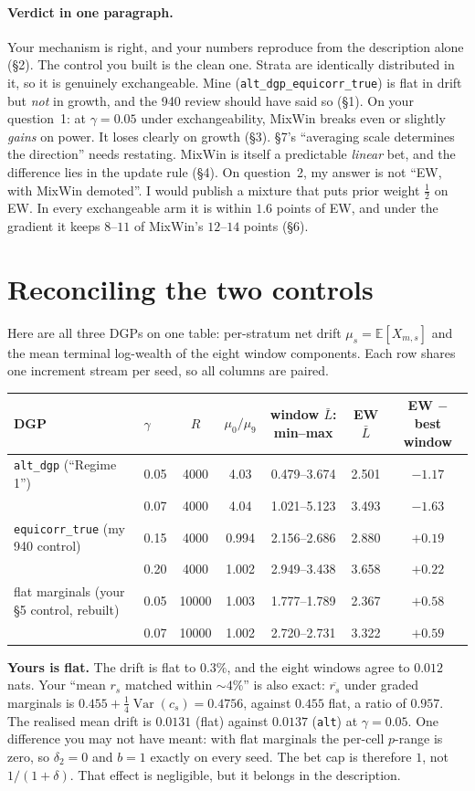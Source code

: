 \documentclass[11pt]{article}
\newcommand{\E}{\mathbb{E}}
\begin{document}
\paragraph{Verdict in one paragraph.} Your mechanism is right, and your numbers reproduce from the description alone (\S2). The control you built is the clean one. Strata are identically distributed in it, so it is genuinely exchangeable. Mine (\texttt{alt\_dgp\_equicorr\_true}) is flat in drift but \emph{not} in growth, and the 940 review should have said so (\S1).
On your question~1: at $\gamma=0.05$ under exchangeability, MixWin breaks even or slightly \emph{gains} on power. It loses clearly on growth (\S3).
\S7's ``averaging scale determines the direction'' needs restating. MixWin is itself a predictable \emph{linear} bet, and the difference lies in the update rule (\S4).
On question~2, my answer is not ``EW, with MixWin demoted''. I would publish a mixture that puts prior weight $\tfrac12$ on EW. In every exchangeable arm it is within $1.6$ points of EW, and under the gradient it keeps $8$--$11$ of MixWin's $12$--$14$ points (\S6).

\section{Reconciling the two controls}\label{sec:controls}
Here are all three DGPs on one table: per-stratum net drift $\mu_s=\E[X_{m,s}]$ and the mean terminal log-wealth of the eight window components. Each row shares one increment stream per seed, so all columns are paired.
\begin{center}\small
\begin{tabular}{llccccc}
\toprule
DGP & $\gamma$ & $R$ & $\mu_0/\mu_9$ & window $\bar L$: min--max & EW $\bar L$ & EW $-$ best window\\
\midrule
\texttt{alt\_dgp} (``Regime 1'') & 0.05 & 4000 & 4.03 & 0.479--3.674 & 2.501 & $-1.17$\\
 & 0.07 & 4000 & 4.04 & 1.021--5.123 & 3.493 & $-1.63$\\
\texttt{equicorr\_true} (my 940 control) & 0.15 & 4000 & 0.994 & 2.156--2.686 & 2.880 & $+0.19$\\
 & 0.20 & 4000 & 1.002 & 2.949--3.438 & 3.658 & $+0.22$\\
flat marginals (your \S5 control, rebuilt) & 0.05 & 10000 & 1.003 & 1.777--1.789 & 2.367 & $+0.58$\\
 & 0.07 & 10000 & 1.002 & 2.720--2.731 & 3.322 & $+0.59$\\
\bottomrule
\end{tabular}
\end{center}
\textbf{Yours is flat.} The drift is flat to $0.3\%$, and the eight windows agree to $0.012$ nats. Your ``mean $r_s$ matched within ${\sim}4\%$'' is also exact: $\overline{r_s}$ under graded marginals is $0.455+\tfrac14\operatorname{Var}(c_s)=0.4756$, against $0.455$ flat, a ratio of $0.957$. The realised mean drift is $0.0131$ (flat) against $0.0137$ (\texttt{alt}) at $\gamma=0.05$. One difference you may not have meant: with flat marginals the per-cell $p$-range is zero, so $\delta_2=0$ and $b=1$ exactly on every seed. The bet cap is therefore $1$, not $1/(1+\delta)$. That effect is negligible, but it belongs in the description.
\end{document}
